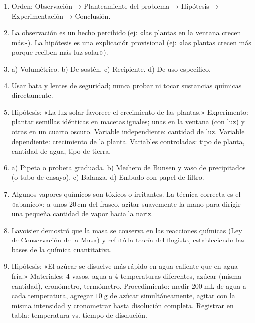 \documentclass[12pt, a4paper]{article}
\begin{document}
\begin{enumerate}[leftmargin=*, label=\textbf{\arabic*.}]
  \item Orden: Observación → Planteamiento del problema → Hipótesis → Experimentación → Conclusión.

  \item La observación es un hecho percibido (ej: «las plantas en la ventana crecen más»). La hipótesis es una explicación provisional (ej: «las plantas crecen más porque reciben más luz solar»).

  \item a) Volumétrico. b) De sostén. c) Recipiente. d) De uso específico.

  \item Usar bata y lentes de seguridad; nunca probar ni tocar sustancias químicas directamente.

  \item Hipótesis: «La luz solar favorece el crecimiento de las plantas.» Experimento: plantar semillas idénticas en macetas iguales; unas en la ventana (con luz) y otras en un cuarto oscuro. Variable independiente: cantidad de luz. Variable dependiente: crecimiento de la planta. Variables controladas: tipo de planta, cantidad de agua, tipo de tierra.

  \item a) Pipeta o probeta graduada. b) Mechero de Bunsen y vaso de precipitados (o tubo de ensayo). c) Balanza. d) Embudo con papel de filtro.

  \item Algunos vapores químicos son tóxicos o irritantes. La técnica correcta es el «abanico»: a unos 20\,cm del frasco, agitar suavemente la mano para dirigir una pequeña cantidad de vapor hacia la nariz.

  \item Lavoisier demostró que la masa se conserva en las reacciones químicas (Ley de Conservación de la Masa) y refutó la teoría del flogisto, estableciendo las bases de la química cuantitativa.

  \item Hipótesis: «El azúcar se disuelve más rápido en agua caliente que en agua fría.» Materiales: 4 vasos, agua a 4 temperaturas diferentes, azúcar (misma cantidad), cronómetro, termómetro. Procedimiento: medir $200\;\text{mL}$ de agua a cada temperatura, agregar $10\;\text{g}$ de azúcar simultáneamente, agitar con la misma intensidad y cronometrar hasta disolución completa. Registrar en tabla: temperatura vs. tiempo de disolución.


\end{enumerate}
\end{document}
